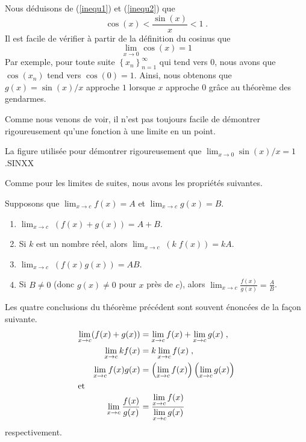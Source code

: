 {\begin{egg}[\theory]
Nous déduisons de (\ref{inequ1}) et (\ref{inequ2}) que
\[
\cos(x) < \frac{\sin(x)}{x} < 1  \; .
\]
Il est facile de vérifier à partir de la définition du cosinus que
\[
\lim_{x\rightarrow 0} \cos(x) = 1
\]
Par exemple, pour toute suite
$\displaystyle \left\{x_n\right\}_{n=1}^\infty$ qui tend vers $0$,
nous avons que $\cos(x_n)$ tend vers $\cos(0) = 1$. Ainsi, nous
obtenons que
$g(x) = \sin(x)/x$ approche $1$ lorsque $x$ approche $0$ grâce au
théorème des gendarmes.
\label{R_SINXX}
\end{egg}

Comme nous venons de voir, il n'est pas toujours facile de démontrer
rigoureusement qu'une fonction à une limite en un point.

{La figure utilisée pour démontrer rigoureusement que
$\displaystyle \lim_{x\rightarrow 0} \sin(x)/x = 1$.}{SINXX}

Comme pour les limites de suites, nous avons les propriétés suivantes.

\begin{theorem} \label{lim_funct_scd}
Supposons que $\displaystyle \lim_{x\rightarrow c} f(x) = A$ et
$\displaystyle \lim_{x\rightarrow c} g(x) = B$.
\begin{enumerate}
\item $\displaystyle \lim_{x\rightarrow c}\; (f(x) + g(x) ) = A + B$.
\item Si $k$ est un nombre réel, alors
$\displaystyle \lim_{x\rightarrow c}\; (k\; f(x)) = kA$.
\item $\displaystyle \lim_{x\rightarrow c}\; (f(x)g(x)) = AB$.
\item Si $B \neq 0$ (donc $g(x) \neq 0$ pour $x$ près de $c$),
alors $\displaystyle \lim_{x\rightarrow c} \frac{f(x)}{g(x)} = \frac{A}{B}$.
\end{enumerate}
\end{theorem}

Les quatre conclusions du théorème précédent sont souvent énoncées de
la façon suivante.
\begin{align*}
\lim_{x\rightarrow c} (f(x)+g(x)) &= \lim_{x\rightarrow c} f(x) +
\lim_{x\rightarrow c} g(x) \; , \\
\lim_{x\rightarrow c} kf(x) &= k \lim_{x\rightarrow c} f(x) \; , \\
\lim_{x\rightarrow c} f(x)g(x) &= \left(\lim_{x\rightarrow c} f(x)\right) 
\left(\lim_{x\rightarrow c} g(x)\right)  \\
\intertext{et}
\lim_{x\rightarrow c} \frac{f(x)}{g(x)} &=
\frac{\displaystyle \lim_{x\rightarrow c} f(x)}
{\displaystyle \lim_{x\rightarrow c} g(x)}
\end{align*}
respectivement.

}

